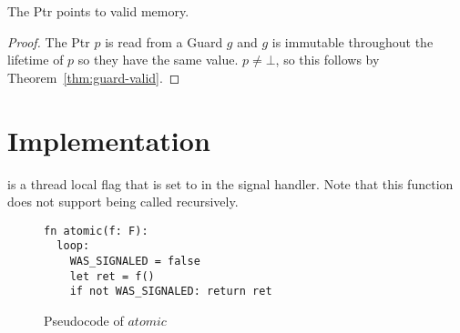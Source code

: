 \begin{lemma}\label{lm:ptr-valid}
  The Ptr points to valid memory.
\end{lemma}
\begin{proof}
The  Ptr $p$ is read from a Guard $g$ and $g$ is immutable throughout the lifetime of $p$ so they
have the same value. $p \neq \bot$, so this follows by Theorem~\ref{thm:guard-valid}.
\end{proof}


\section{Implementation}


   is a thread local flag that is
  set to  in the signal handler. Note that this function does not support being called
  recursively.
\begin{figure}[ht]
\begin{lstlisting}
fn atomic(f: F):
  loop:
    WAS_SIGNALED = false
    let ret = f()
    if not WAS_SIGNALED: return ret
\end{lstlisting}
\caption{Pseudocode of $atomic$}
\end{figure}
